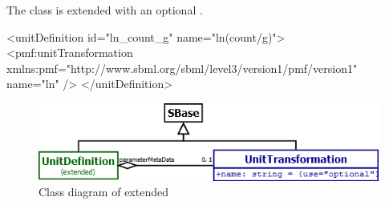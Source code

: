 \subsubsection{}
The \UnitTransformation class is extended with an optional \UnitTransformation.

\begin{example}
<unitDefinition id="ln_count_g" name="ln(count/g)">
  <pmf:unitTransformation xmlns:pmf="http://www.sbml.org/sbml/level3/version1/pmf/version1"
    name="ln" />
</unitDefinition>
\end{example}

\begin{figure}
	\includegraphics[scale=0.7]{img/unitdefinition_uml}
	\caption{Class diagram of extended \UnitDefinition}
	\label{unitdefinition_uml}
\end{figure}
